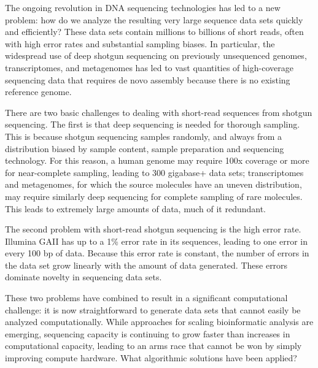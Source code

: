 \documentclass[10pt,draft]{article}
\begin{document}
The ongoing revolution in DNA sequencing technologies has led to a new
problem: how do we analyze the resulting very large sequence data sets
quickly and efficiently? These data sets contain millions to billions
of short reads, often with high error rates and substantial sampling
biases. In particular, the widespread use of deep shotgun sequencing
on previously unsequenced genomes, transcriptomes, and metagenomes has
led to vast quantities of high-coverage sequencing data that requires
de novo assembly because there is no existing reference genome.

There are two basic challenges to dealing with short-read sequences
from shotgun sequencing. The first is that deep sequencing is needed
for thorough sampling. This is because shotgun sequencing samples
randomly, and always from a distribution biased by sample content,
sample preparation and sequencing technology.  For this reason, a
human genome may require 100x coverage or more for near-complete
sampling, leading to 300 gigabase+ data sets; transcriptomes and
metagenomes, for which the source molecules have an uneven
distribution, may require similarly deep sequencing for complete
sampling of rare molecules. This leads to extremely large amounts of
data, much of it redundant.

The second problem with short-read shotgun sequencing is the high
error rate.  Illumina GAII has up to a 1\% error rate in its sequences,
leading to one error in every 100 bp of data.  Because this error rate
is constant, the number of errors in the data set grow linearly with
the amount of data generated.  These errors dominate novelty in
sequencing data sets.

These two problems have combined to result in a significant
computational challenge: it is now straightforward to generate data
sets that cannot easily be analyzed computationally.  While approaches
for scaling bioinformatic analysis are emerging, sequencing capacity
is continuing to grow faster than increases in computational capacity,
leading to an arms race that cannot be won by simply improving compute
hardware.  What algorithmic solutions have been applied?
\end{document}

